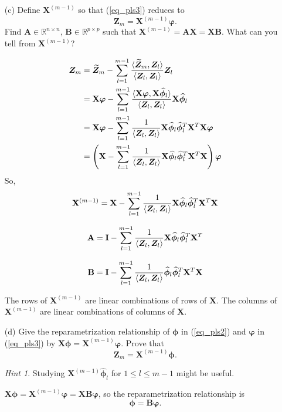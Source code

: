 \documentclass[10pt]{article}
\theoremstyle{definition}
\theoremstyle{remark}
\newtheorem*{hint}{Hint}
\newcommand{\Ab}{\mathbf{A}}
\newcommand{\Bb}{\mathbf{B}}
\newcommand{\Ib}{\mathbf{I}}
\newcommand{\Xb}{\mathbf{X}}
\newcommand{\bZ}{\bm{Z}}
\newcommand{\bphi}{\bm{\phi}}
\newcommand{\bvarphi}{\bm{\varphi}}
\newcommand{\bbR}{\mathbb{R}}
\begin{document}
\begin{enumerate}
\begin{itemize}[leftmargin=*]
		\item [(c)] Define $ \Xb^{(m-1)} $ so that (\ref{eq_pls3}) reduces to
		\[ \bZ_{m} = \Xb^{(m-1)}\bvarphi. \]
		Find $ \Ab \in \bbR^{n\times n} $, $ \Bb \in \bbR^{p \times p} $ such that $ \Xb^{(m-1)} = \Ab \Xb = \Xb \Bb $. What can you tell from $ \Xb^{(m-1)} $? 
		
		\begin{align*}
		    \bZ_{m} & = \widetilde{\bZ}_{m} - \sum_{l=1}^{m-1}{\langle \widetilde{\bZ}_{m}, \bZ_{l} \rangle \over \langle \bZ_{l}, \bZ_{l} \rangle }\bZ_{l} \\
		    & = \Xb\bvarphi - \sum_{l=1}^{m-1}{\langle \Xb\bvarphi, \Xb\widehat{\bphi}_{l} \rangle \over \langle \bZ_{l}, \bZ_{l} \rangle }\Xb\widehat{\bphi}_{l} \\
		    & = \Xb\bvarphi - \sum_{l=1}^{m-1}{ 1 \over \langle \bZ_{l}, \bZ_{l} \rangle } \Xb\widehat{\bphi}_{l} \widehat{\bphi}_{l}^T\Xb^T \Xb\bvarphi \\
		    & = \left( \Xb - \sum_{l=1}^{m-1}{ 1 \over \langle \bZ_{l}, \bZ_{l} \rangle } \Xb\widehat{\bphi}_{l} \widehat{\bphi}_{l}^T\Xb^T \Xb \right) \bvarphi 
		\end{align*}
		So, \[ \Xb^{(m-1)} = \Xb - \sum_{l=1}^{m-1}{ 1 \over \langle \bZ_{l}, \bZ_{l} \rangle }  \Xb\widehat{\bphi}_{l} \widehat{\bphi}_{l}^T\Xb^T \Xb \]
		
		\[ \Ab = \Ib - \sum_{l=1}^{m-1}{ 1 \over \langle \bZ_{l}, \bZ_{l} \rangle } \Xb\widehat{\bphi}_{l} \widehat{\bphi}_{l}^T\Xb^T \]
		
		\[ \Bb = \Ib - \sum_{l=1}^{m-1}{ 1 \over \langle \bZ_{l}, \bZ_{l} \rangle } \widehat{\bphi}_{l} \widehat{\bphi}_{l}^T\Xb^T \Xb \]
		
		The rows of $ \Xb^{(m-1)} $ are linear combinations of rows of $ \Xb $. The columns of $ \Xb^{(m-1)} $ are linear combinations of columns of $ \Xb $.
		
		\item [(d)] Give the reparametrization relationship of $ \bphi $ in (\ref{eq_pls2}) and $ \bvarphi $ in (\ref{eq_pls3}) by $ \Xb\bphi = \Xb^{(m-1)}\bvarphi $. Prove that
		\[ \bZ_{m} = \Xb^{(m-1)}\bphi. \]
		\begin{hint}
			Studying $ \Xb^{(m-1)}\widehat{\bphi}_{l} $ for $ 1 \le l \le m-1 $ might be useful.
		\end{hint}
		
		$ \Xb\bphi = \Xb^{(m-1)}\bvarphi = \Xb\Bb\bvarphi $,
		so the reparametrization relationship is \[ \bphi = \Bb\bvarphi . \]
		

\end{itemize}
\end{enumerate}
\end{document}
